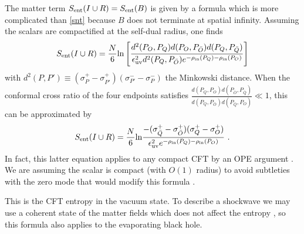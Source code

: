 \documentclass[12pt,oneside,letterpaper]{article}
\newcommand{\be}{\begin{equation}}
\newcommand{\ee}{\end{equation}}
\def\be{\begin{eqnarray}}
\def\ee{\end{eqnarray}}
\let\s=\sigma \let\t=\tau \let\u=\upsilon \let\c=\chi
\def\be{\begin{equation}}
\def\ee{\end{equation}}
\def\euv{\epsilon_{\rm uv}}
\def\log{{\rm ln}}
\numberwithin{equation}{section}
\def \be {\begin{equation}}
\def \ee {\end{equation}}
\begin{document}
The matter term $S_{\rm ent }({I \cup R})=S_{\rm ent }(B)$ is given by a formula which is more complicated than \eqref{snt} because $B$ does not terminate at spatial infinity. Assuming the scalars are compactified at the self-dual radius, one finds \cite{Calabrese:2009ez}
\be\label{sdboson}
S_{\rm ent}(I \cup R)  = \frac{N}{6}\log\left[ 
\frac{
d^2(P_O,P_Q) d(P_O, P_{{\bar{O}}}) d(P_Q, P_{\bar{Q}}) }{
 \euv^2 
 d^2(P_Q, P_{\bar{O}})
 e^{-\rho_{\rm in}(P_Q) - \rho_{\rm in}(P_O)}
 }
 \right]
\ee
with $d^2(P,P') \equiv (\sigma_P^+ - \sigma_{P'}^+)(\sigma_{P'}^- - \sigma_{P}^-)$ the Minkowski distance. When the conformal cross ratio of the four endpoints satisfies $\frac{d(P_Q, P_O)d(P_{\bar{O}}, P_{\bar{Q}})}{d(P_Q, P_{\bar{O}}) d(P_{\bar{Q}}, P_O)} \ll 1$, this can be approximated by
\be\label{holoS}
S_{\rm ent}(I\cup R) = \frac{N}{6}\log  \frac{ - (\s^+_{\bar Q}  - \s^+_{\bar O} )(\s^+_{Q}  - \s^+_{O} ) }{\euv ^2 e^{-\rho_{\rm in}(P_Q) - \rho_{\rm in}(P_O) } } \ .
\ee
In fact, this latter equation applies to any compact CFT by an OPE argument \cite{Calabrese:2009qy}. We are assuming the scalar is compact (with $O(1)$ radius) to avoid subtleties with the zero mode that would modify this formula \cite{Fiola:1994ir,Calabrese:2009ez}.


This is the CFT entropy in the vacuum state. To describe a  shockwave we may use  a coherent state of the matter fields which does not affect the entropy \cite{Fiola:1994ir}, so this formula also applies to the evaporating black hole.
\end{document}
